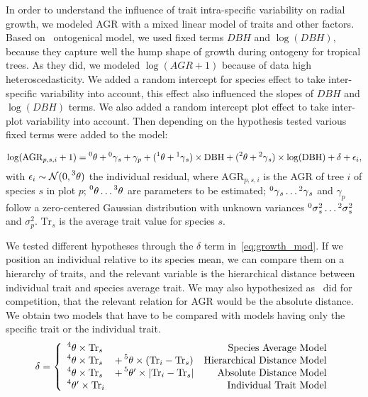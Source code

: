 In order to understand the influence of trait intra-specific variability on radial growth, we modeled AGR with a mixed linear model of traits and other factors. Based on~\citet{herault_functional_2011} ontogenical model, we used fixed terms $DBH$ and $\log(DBH)$, because they capture well the hump shape of growth during ontogeny for tropical trees. As they did, we modeled $\log(AGR + 1)$ because of data high heteroscedasticity. We added a random intercept for species effect to take inter-specific variability into account, this effect also influenced the slopes of $DBH$ and $\log(DBH)$ terms. We also added a random intercept plot effect to take inter-plot variability into account. Then depending on the hypothesis tested various fixed terms were added to the model:

\begin{equation}
	\label{eq:growth_mod}
	\log(\text{AGR}_{p, s, i} + 1) = \prescript{0}{}\theta + \prescript{0}{}\gamma_s + \gamma_p
		+ (\prescript{1}{}\theta + \prescript{1}{}\gamma_s) \times \text{DBH}
		+ (\prescript{2}{}\theta + \prescript{2}{}\gamma_s) \times \log(\text{DBH})
		+ \delta
		+ \epsilon_i,
\end{equation}
with $\epsilon_i \sim \mathcal{N}(0, \prescript{3}{}\theta)$ the individual residual,
where $\text{AGR}_{p, s, i}$ is the AGR of tree $i$ of species $s$ in plot $p$; $\prescript{0}{}\theta \dots \prescript{3}{}\theta$ are parameters to be estimated; $\prescript{0}{}\gamma_{s} \dots \prescript{2}{}\gamma_s$ and $\gamma_p$ follow a zero-centered Gaussian distribution with unknown variances $\prescript{0}{}\sigma^2_s \dots \prescript{2}{}\sigma^2_s$ and $\sigma^2_p$. $\text{Tr}_s$ is the average trait value for species $s$.

We tested different hypotheses through the $\delta$ term in~\autoref{eq:growth_mod}. If we position an individual relative to its species mean, we can compare them on a hierarchy of traits, and the relevant variable is the hierarchical distance between individual trait and species average trait. We may also hypothesized as~\citet{kunstler_competitive_2012} did for competition, that the relevant relation for AGR would be the absolute distance. We obtain two models that have to be compared with models having only the specific trait or the individual trait.
\begin{equation}
\label{eq:delta}
\delta = \left\{
	\begin{array}{llr}
		\prescript{4}{}\theta\times \text{Tr}_s & & \text{Species Average Model} \\
		\prescript{4}{}\theta \times \text{Tr}_s & + \prescript{5}{}\theta \times(\text{Tr}_i - \text{Tr}_s) & \text{Hierarchical Distance Model} \\
		\prescript{4}{}\theta \times \text{Tr}_s & + \prescript{5}{}\theta' \times \vert \text{Tr}_i - \text{Tr}_s \vert & \text{Absolute Distance Model} \\
		\prescript{4}{}\theta' \times \text{Tr}_i & & \text{Individual Trait Model} \\
	\end{array}
\right.
\end{equation}


